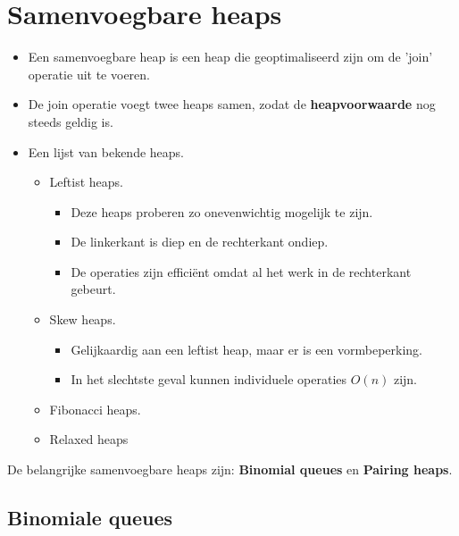 \chapter{Samenvoegbare heaps}
\begin{itemize}
    \item Een samenvoegbare heap is een heap die geoptimaliseerd zijn om de 'join' operatie uit te voeren.
    \item De join operatie voegt twee heaps samen, zodat de \textbf{heapvoorwaarde} nog steeds geldig is. 
    \item Een lijst van bekende heaps.
    \begin{itemize}
		\item Leftist heaps.
		\begin{itemize}
			\item Deze heaps proberen zo onevenwichtig mogelijk te zijn.
			\item De linkerkant is diep en de rechterkant ondiep.
			\item De operaties zijn efficiënt omdat al het werk in de rechterkant gebeurt.
		\end{itemize}
		\item Skew heaps.
		\begin{itemize}
			\item Gelijkaardig aan een leftist heap, maar er is een vormbeperking.
			\item In het slechtste geval kunnen individuele operaties $O(n)$ zijn.
		\end{itemize}
		\item Fibonacci heaps.
        \item Relaxed heaps
    \end{itemize}
    
\end{itemize}





De belangrijke samenvoegbare heaps zijn: \textbf{Binomial queues} en \textbf{Pairing heaps}.

\section{Binomiale queues}


